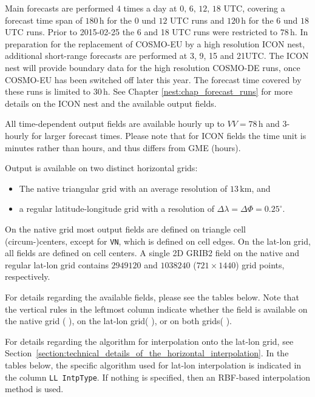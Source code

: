 Main forecasts are performed $4$ times a day at $0,\, 6,\, 12,\, 18$ UTC, covering a forecast time span of $180\,\mathrm{h}$ for the 
$0$ und $12$ UTC runs and $120\,\mathrm{h}$ for the $6$ und $18$ UTC runs. Prior to 2015-02-25 the 6 and 18 UTC runs were restricted 
to $78\,\mathrm{h}$. In preparation for the replacement of COSMO-EU by a high resolution ICON nest, additional short-range forecasts 
are performed at 3, 9, 15 and 21UTC. The ICON nest will provide boundary data for the high resolution COSMO-DE runs, once COSMO-EU has 
been switched off later this year. The forecast time covered by these runs is limited to $30\,\mathrm{h}$. See Chapter 
\ref{nest:chap_forecast_runs} for more details on the ICON nest and the available output fields. 

All time-dependent output fields are available hourly up to
$VV=78\,\mathrm{h}$ and 3-hourly for larger forecast
times\footnotemark[2].
%
Please note that for ICON fields the time unit is minutes rather than
hours, and thus differs from GME (hours).

Output is available on two distinct horizontal grids: 
\begin{itemize}
  \item The native triangular grid with an average resolution of $13\,\mathrm{km}$, and
  \item a regular latitude-longitude grid with a resolution of $\Delta \lambda = \Delta \Phi=0.25^{\circ}$. 
\end{itemize}
On the native grid most output fields are defined on triangle cell
(circum-)centers, except for \texttt{VN}, which is defined on cell
edges. On the lat-lon grid, all fields are defined on cell centers.
%
A single 2D GRIB2 field on the native and regular lat-lon grid
contains $2949120$ and $1038240$ ($721 \times 1440$) grid points, respectively.


For details regarding the available fields, please see the tables below. Note that the vertical rules in the leftmost column indicate whether the field is 
available on the native grid ($\,$\markRed$\,$), on the lat-lon grid($\,$\markBlue$\,$), or on both grids($\,$\markRed\markBlue$\,$). 

For details regarding the algorithm for interpolation onto the lat-lon
grid, see
Section~\ref{section:technical_details_of_the_horizontal_interpolation}. In the tables below, the specific algorithm used for 
lat-lon interpolation is indicated in the column \texttt{LL IntpType}. If nothing is specified, then an RBF-based interpolation 
method is used.

